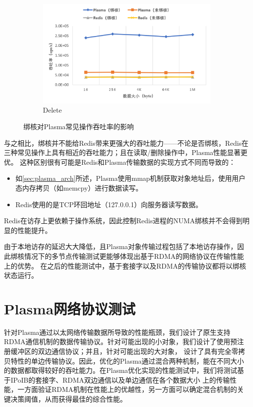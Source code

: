 \begin{figure}[h]
	\\
	\centering
    \begin{subfigure}{0.5\textwidth}
        \includegraphics[width=\textwidth]{image/chap04/del.png}
        \caption{Delete}
    \end{subfigure}
    \caption{绑核对Plasma常见操作吞吐率的影响}
    \label{fig:numa}
\end{figure}

与之相比，绑核并不能给Redis带来更强大的吞吐能力——不论是否绑核，Redis在三种常见操作上具有相近的吞吐能力；且在读取/删除操作中，Plasma性能显著更优。
这种区别很有可能是Redis和Plasma传输数据的实现方式不同而导致的：
\begin{itemize}
    \item 如\autoref{sec:plasma_arch}所述，Plasma使用mmap机制获取对象地址后，使用用户态内存拷贝（如memcpy）进行数据读写。
    \item Redis使用的是TCP环回地址（127.0.0.1）向服务器读写数据。
\end{itemize}
Redis在访存上更依赖于操作系统，因此控制Redis进程的NUMA绑核并不会得到明显的性能提升。

由于本地访存的延迟大大降低，且Plasma对象传输过程包括了本地访存操作，因此绑核情况下的多节点传输测试更能够体现出基于RDMA的网络协议在传输性能上的优势。
在之后的性能测试中，基于套接字以及RDMA的传输协议都将以绑核状态运行。

\section{Plasma网络协议测试}

针对Plasma通过以太网络传输数据所导致的性能瓶颈，我们设计了原生支持RDMA通信机制的数据传输协议。针对可能出现的小对象，我们设计了使用预注册缓冲区的双边通信协议；并且，针对可能出现的大对象，
设计了具有完全零拷贝特性的单边传输协议。因此，优化的Plasma通过混合两种机制，能在不同大小的数据都取得较好的吞吐能力。在Plasma优化实现的性能测试中，我们将测试基于IPoIB的套接字、RDMA双边通信以及单边通信在各个数据大小
上的传输性能，一方面验证RDMA机制在性能上的优越性，另一方面可以确定混合机制的关键决策阈值，从而获得最佳的综合性能。

